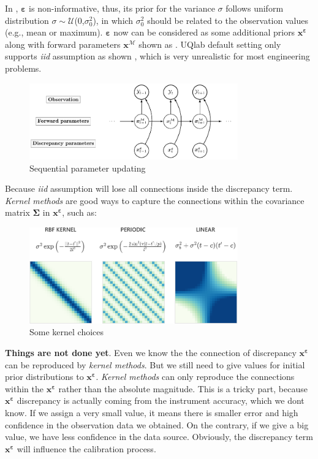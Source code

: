 \documentclass{ol-softwaremanual}
\begin{document}
In , $\boldsymbol{\varepsilon}$ is non-informative, thus, its prior for the variance $\sigma$ follows uniform distribution $\sigma\sim \mathcal{U}$(0,$\sigma_{0}^2$), in which $\sigma_{0}^2$ should be related to the observation values (e.g., mean or maximum). $\boldsymbol{\varepsilon}$ now can be considered as some additional priors $\boldsymbol{x^{\varepsilon}}$ along with forward parameters $\boldsymbol{x}^{\mathcal{M}}$ shown as . UQlab default setting only supports \textit{iid} assumption as shown , which is very unrealistic for most engineering problems. 
 \begin{figure}[htbp]
    \centering
    \includegraphics[width = 90mm]{figures/figure-Sequential_Bayesian_updating.pdf}
    \caption{Sequential parameter updating}
    \label{fig:figure-Sequential_Bayesian_updating}
\end{figure}
Because \textit{iid} assumption will lose all connections inside the discrepancy term. \textit{Kernel methods} are good ways to capture the connections within the covariance matrix $\boldsymbol{\Sigma}$ in $\boldsymbol{x^{\varepsilon}}$, such as:
 \begin{figure}[htbp]
    \centering
    \includegraphics[width = 90mm]{figures/figure-kernel.pdf}
    \caption{Some kernel choices}
    \label{fig:figure-kernel}
\end{figure}

\textbf{Things are not done yet}. Even we know the the connection of discrepancy $\boldsymbol{x^{\varepsilon}}$ can be reproduced by \textit{kernel methods}. But we still need to give values for initial prior distributions to $\boldsymbol{x^{\varepsilon}}$. \textit{Kernel methods} can only reproduce the connections within the $\boldsymbol{x^{\varepsilon}}$ rather than the absolute magnitude. This is a tricky part, because $\boldsymbol{x^{\varepsilon}}$ discrepancy is actually coming from the instrument accuracy, which we dont know. If we assign a very small value, it means there is smaller error and high confidence in the observation data we obtained. On the contrary, if we give a big value, we have less confidence in the data source. Obviously, the discrepancy term $\boldsymbol{x^{\varepsilon}}$ will influence the calibration process.
\end{document}
